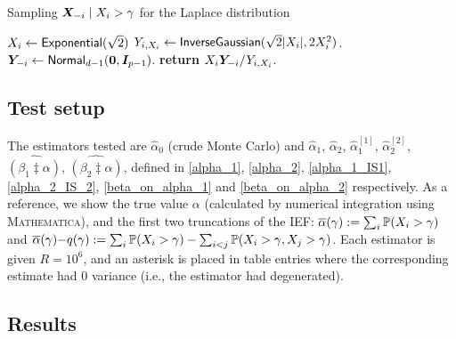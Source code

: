 \begin{algorithm}
\caption{Sampling $\bm{X}_{-i} \mid X_i > \gamma$ for the Laplace distribution}
\label{alg:cond_normals}
\begin{algorithmic}[1]
\State $X_i \gets \mathsf{Exponential}(\sqrt{2})$
\State $Y_{i,X_i} \gets \mathsf{InverseGaussian}(\sqrt{2} \lvert X_i\rvert,2 X_i^2)$.
\State $\bm{Y}_{-i} \gets \mathsf{Normal}_{d-1}(\bm{0},\bm{I}_{p-1})$.
\State \textbf{return} $X_i \bm{Y}_{-i} / Y_{i,X_i}$.
\end{algorithmic}
\end{algorithm}

\subsection{Test setup}

The estimators tested are $\hat{\alpha}_0$ (crude Monte Carlo) and
 $\hat{\alpha}_1$, $\hat{\alpha}_2$, $\hat{\alpha}_1^{[1]}$, $\hat{\alpha}_2^{[2]}$, $\widehat{(\beta_1 \ddagger \alpha)}$, $\widehat{(\beta_2 \ddagger \alpha)}$, defined in \eqref{alpha_1}, \eqref{alpha_2}, \eqref{alpha_1_IS1}, \eqref{alpha_2_IS_2}, \eqref{beta_on_alpha_1} and \eqref{beta_on_alpha_2} respectively. As a reference, we show the true value $\alpha$ (calculated by numerical integration using \textsc{Mathematica}), and the first two truncations of the IEF:
$ \overline{\alpha}(\gamma) := \sum_i \operatorname{{\mathbb P}}(X_i > \gamma)$ and $\overline{\alpha}(\gamma){-}q(\gamma) := \sum_i \operatorname{{\mathbb P}}(X_i > \gamma) - \sum_{i<j} \operatorname{{\mathbb P}}(X_i > \gamma, X_j > \gamma)$.
Each estimator is given $R=10^6$, and an asterisk is placed in table entries where the corresponding estimate had 0 variance (i.e., the estimator had degenerated).
% 

\newpage
\subsection{Results}
\enlargethispage{1cm}

